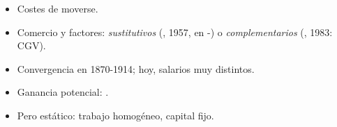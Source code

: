 \documentclass{article}
\begin{document}
\begin{columnas}
\begin{itemize}
\item Costes de moverse.
\item Comercio y factores: \emph{sustitutivos} (, 1957, en -) o \emph{complementarios} (, 1983: CGV).
\end{itemize}
\begin{itemize}
\item Convergencia en 1870-1914; hoy, salarios muy distintos.
\item Ganancia potencial: .
\item Pero estático: trabajo homogéneo, capital fijo.
\end{itemize}


\end{columnas}
\end{document}
